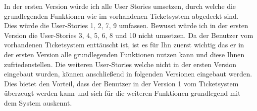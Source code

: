 

In der ersten Version würde ich alle User Stories umsetzen, durch welche die grundlegenden Funktionen wie im vorhandenen Ticketsystem abgedeckt sind. Dies würde die User-Stories 1, 2, 7, 9 umfassen.
Bewusst würde ich in der ersten Version die User-Stories 3, 4, 5, 6, 8 und 10 nicht umsetzen. Da der Benutzer vom vorhandenen Ticketsystem enttäuscht ist, ist es für Ihn zuerst wichtig das er in der ersten Version alle grundlegenden Funktionen nutzen kann und diese Ihnen zufriedenstellen. Die weiteren User-Stories welche nicht in der ersten Version eingebaut wurden, können anschließend in folgenden Versionen eingebaut werden. Dies bietet den Vorteil, dass der Benutzer in der Version 1 vom Ticketsystem überzeugt werden kann und sich für die weiteren Funktionen grundlegend mit dem System auskennt. 
